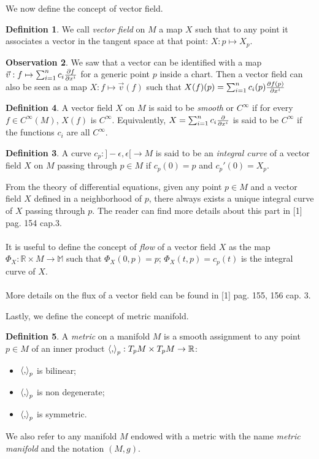 \documentclass[12pt,a4paper]{report}
\theoremstyle{definition}
\newtheorem{Def}{Definition}[chapter]
\theoremstyle{Theorem}
\theoremstyle{definition}
\theoremstyle{definition}
\newtheorem{Obs}[Def]{Observation}
\begin{document}
	We now define the concept of vector field.
	\begin{Def}
		We call \textit{vector field} on $M$ a map $X$ such that to any point it associates a vector in the tangent space at that point: $X:p\mapsto X_p$. 
	\end{Def}
	\begin{Obs}
		We saw that a vector can be identified with a map $\vec{v}:f\mapsto\sum_{i=1}^{n}c_i{\partial f\over \partial x^i}$ for a generic point $p$ inside a chart. Then a vector field can also be seen as a map $X:f\mapsto\vec{v}(f)$ such that $X(f)(p)=\sum_{i=1}^{n}c_i(p){\partial f(p)\over \partial x^i}$
	\end{Obs}
	\begin{Def}
		A vector field $X$ on $M$ is said to be \textit{smooth} or $C^\infty$ if for every $f\in C^\infty(M)$, $X(f)$ is $C^\infty$. Equivalently, $X=\sum_{i=1}^{n}c_i{\partial\over \partial x^i}$ is said to be $C^\infty$ if the functions $c_i$ are all $C^\infty$.
		\begin{Def}
			A curve $c_p:]-\epsilon,\epsilon[\rightarrow M$ is said to be an \textit{integral curve} of a vector field $X$ on $M$ passing through $p\in M$ if $c_p(0)=p$ and $c_p'(0)=X_p$.
		\end{Def}
		From the theory of differential equations, given any point $p\in M$ and a vector field $X$ defined in a neighborhood of $p$, there always exists a unique integral curve of $X$ passing through $p$. The reader can find more details about this part in [1] pag. 154 cap.3.\\
		\\
		It is useful to define the concept of \textit{flow} of a vector field $X$ as the map $\Phi_X:\mathbb{R}\times M\rightarrow\mathbb{M}$ such that $\Phi_X(0,p)=p$; $\Phi_X(t,p)=c_p(t)$ is the integral curve of $X$.\\
		\\
		More details on the flux of a vector field can be found in [1] pag. 155, 156 cap. 3.
	\end{Def}
	Lastly, we define the concept of metric manifold.
	\begin{Def}
		A \textit{metric} on a manifold $M$ is a smooth assignment to any point $p\in M$ of an inner product $\braket{,}_p:T_pM\times T_pM\rightarrow \mathbb{R}$:
		\begin{itemize}
			\item $\braket{,}_p$ is bilinear;
			\item $\braket{,}_p$ is non degenerate;
			\item $\braket{,}_p$ is symmetric.
		\end{itemize}
		We also refer to any manifold $M$ endowed with a metric with the name \textit{metric manifold} and the notation $(M,g)$.
	\end{Def}
\end{document}
